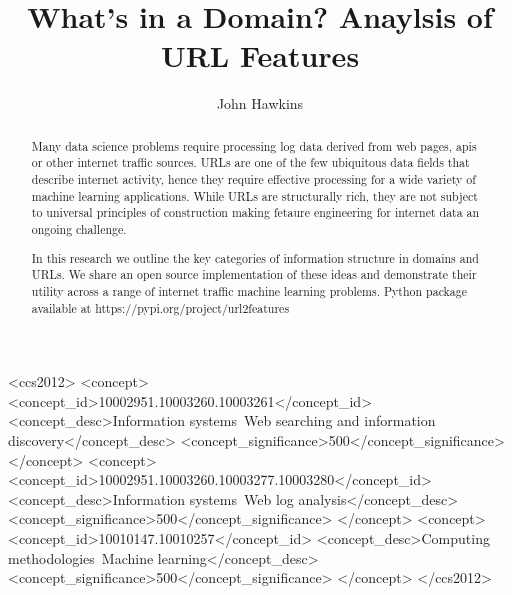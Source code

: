 \documentclass[sigconf]{acmart}
\begin{document}
\title{What's in a Domain? Anaylsis of URL Features}

\author{John Hawkins}

\renewcommand{\shortauthors}{Hawkins}

\begin{abstract}
Many data science problems require processing log data derived from web pages, apis or other
internet traffic sources. URLs are one of the few ubiquitous data fields that describe
internet activity, hence they require effective processing for a wide variety of machine 
learning applications. While URLs are structurally rich, they are not subject
to universal principles of construction making fetaure engineering for internet data an ongoing challenge.

In this research we outline the key categories of information structure in domains and URLs.
We share an open source implementation of these ideas and demonstrate their utility across a range of 
internet traffic machine learning problems. Python package available at https://pypi.org/project/url2features
\end{abstract}


\begin{CCSXML}
<ccs2012>
<concept>
<concept_id>10002951.10003260.10003261</concept_id>
<concept_desc>Information systems~Web searching and information discovery</concept_desc>
<concept_significance>500</concept_significance>
</concept>
<concept>
<concept_id>10002951.10003260.10003277.10003280</concept_id>
<concept_desc>Information systems~Web log analysis</concept_desc>
<concept_significance>500</concept_significance>
</concept>
<concept>
<concept_id>10010147.10010257</concept_id>
<concept_desc>Computing methodologies~Machine learning</concept_desc>
<concept_significance>500</concept_significance>
</concept>
</ccs2012>
\end{CCSXML}
\end{document}
